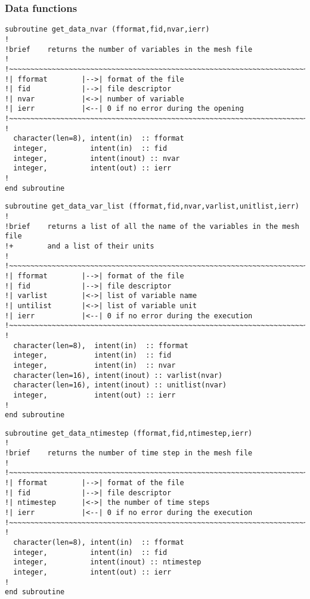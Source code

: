 \subsubsection{Data functions}
%
\begin{lstlisting}
subroutine get_data_nvar (fformat,fid,nvar,ierr)
!
!brief    returns the number of variables in the mesh file
!
!~~~~~~~~~~~~~~~~~~~~~~~~~~~~~~~~~~~~~~~~~~~~~~~~~~~~~~~~~~~~~~~~~~~~~~~
!| fformat        |-->| format of the file
!| fid            |-->| file descriptor
!| nvar           |<->| number of variable
!| ierr           |<--| 0 if no error during the opening
!~~~~~~~~~~~~~~~~~~~~~~~~~~~~~~~~~~~~~~~~~~~~~~~~~~~~~~~~~~~~~~~~~~~~~~~
!
  character(len=8), intent(in)  :: fformat
  integer,          intent(in)  :: fid
  integer,          intent(inout) :: nvar
  integer,          intent(out) :: ierr
!
end subroutine
\end{lstlisting}
%
\begin{lstlisting}
subroutine get_data_var_list (fformat,fid,nvar,varlist,unitlist,ierr)
!
!brief    returns a list of all the name of the variables in the mesh file
!+        and a list of their units
!
!~~~~~~~~~~~~~~~~~~~~~~~~~~~~~~~~~~~~~~~~~~~~~~~~~~~~~~~~~~~~~~~~~~~~~~~
!| fformat        |-->| format of the file
!| fid            |-->| file descriptor
!| varlist        |<->| list of variable name
!| untilist       |<->| list of variable unit
!| ierr           |<--| 0 if no error during the execution
!~~~~~~~~~~~~~~~~~~~~~~~~~~~~~~~~~~~~~~~~~~~~~~~~~~~~~~~~~~~~~~~~~~~~~~~
!
  character(len=8),  intent(in)  :: fformat
  integer,           intent(in)  :: fid
  integer,           intent(in)  :: nvar
  character(len=16), intent(inout) :: varlist(nvar)
  character(len=16), intent(inout) :: unitlist(nvar)
  integer,           intent(out) :: ierr
!
end subroutine
\end{lstlisting}
%
\begin{lstlisting}
subroutine get_data_ntimestep (fformat,fid,ntimestep,ierr)
!
!brief    returns the number of time step in the mesh file
!
!~~~~~~~~~~~~~~~~~~~~~~~~~~~~~~~~~~~~~~~~~~~~~~~~~~~~~~~~~~~~~~~~~~~~~~~
!| fformat        |-->| format of the file
!| fid            |-->| file descriptor
!| ntimestep      |<->| the number of time steps
!| ierr           |<--| 0 if no error during the execution
!~~~~~~~~~~~~~~~~~~~~~~~~~~~~~~~~~~~~~~~~~~~~~~~~~~~~~~~~~~~~~~~~~~~~~~~
!
  character(len=8), intent(in)  :: fformat
  integer,          intent(in)  :: fid
  integer,          intent(inout) :: ntimestep
  integer,          intent(out) :: ierr
!
end subroutine
\end{lstlisting}
